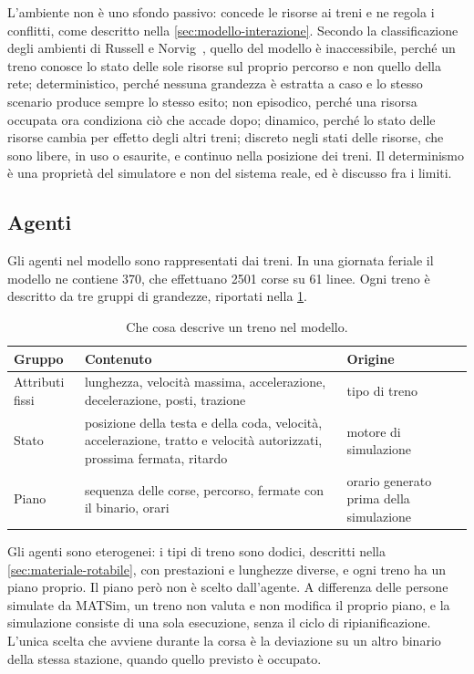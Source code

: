 L'ambiente non è uno sfondo passivo: concede le risorse ai treni e ne regola i conflitti, come descritto nella \cref{sec:modello-interazione}. Secondo la classificazione degli ambienti di Russell e Norvig~\cite{russell_norvig}, quello del modello è inaccessibile, perché un treno conosce lo stato delle sole risorse sul proprio percorso e non quello della rete; deterministico, perché nessuna grandezza è estratta a caso e lo stesso scenario produce sempre lo stesso esito; non episodico, perché una risorsa occupata ora condiziona ciò che accade dopo; dinamico, perché lo stato delle risorse cambia per effetto degli altri treni; discreto negli stati delle risorse, che sono libere, in uso o esaurite, e continuo nella posizione dei treni. Il determinismo è una proprietà del simulatore e non del sistema reale, ed è discusso fra i limiti.

\subsection{Agenti}
Gli agenti nel modello sono rappresentati dai treni. In una giornata feriale il modello ne contiene 370, che effettuano 2501 corse su 61 linee. Ogni treno è descritto da tre gruppi di grandezze, riportati nella \cref{tab:modello-agente}.

\begin{table}[H]
	\centering
	\caption{Che cosa descrive un treno nel modello.}
	\label{tab:modello-agente}
	\begin{tabularx}{\textwidth}{lXl}
		\toprule
		Gruppo & Contenuto & Origine \\
		\midrule
		Attributi fissi & lunghezza, velocità massima, accelerazione, decelerazione, posti, trazione & tipo di treno \\
		Stato & posizione della testa e della coda, velocità, accelerazione, tratto e velocità autorizzati, prossima fermata, ritardo & motore di simulazione \\
		Piano & sequenza delle corse, percorso, fermate con il binario, orari & orario generato prima della simulazione \\
		\bottomrule
	\end{tabularx}
\end{table}

Gli agenti sono eterogenei: i tipi di treno sono dodici, descritti nella \cref{sec:materiale-rotabile}, con prestazioni e lunghezze diverse, e ogni treno ha un piano proprio. Il piano però non è scelto dall'agente. A differenza delle persone simulate da MATSim, un treno non valuta e non modifica il proprio piano, e la simulazione consiste di una sola esecuzione, senza il ciclo di ripianificazione. L'unica scelta che avviene durante la corsa è la deviazione su un altro binario della stessa stazione, quando quello previsto è occupato.

